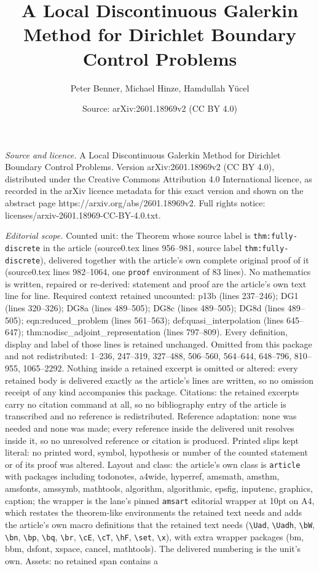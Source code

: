 \documentclass[10pt,a4paper]{amsart}
\title[A Local Discontinuous Galerkin Method for Dirichlet Boundary]{A Local Discontinuous Galerkin Method for Dirichlet Boundary Control Problems}
\author{Peter Benner, Michael Hinze, Hamdullah Y\"ucel}
\date{Source: arXiv:2601.18969v2 (CC BY 4.0)}
\begin{document}
\maketitle

\noindent\emph{Source and licence.} A Local Discontinuous Galerkin Method for Dirichlet Boundary Control Problems. Version arXiv:2601.18969v2 (CC BY 4.0), distributed under the Creative Commons Attribution 4.0 International licence, as recorded in the arXiv licence metadata for this exact version and shown on the abstract page https://arxiv.org/abs/2601.18969v2. Full rights notice: licenses/arxiv-2601.18969-CC-BY-4.0.txt.\par\smallskip

\noindent\textit{Editorial scope.} Counted unit: the Theorem whose source label is \texttt{thm:fully-discrete} in the article (source0.tex lines 956--981, source label \texttt{thm:fully-discrete}), delivered together with the article's own complete original proof of it (source0.tex lines 982--1064, one \texttt{proof} environment of 83 lines). No mathematics is written, repaired or re-derived: statement and proof are the article's own text line for line. Required context retained uncounted: p13b (lines 237--246); DG1 (lines 320--326); DG8a (lines 489--505); DG8c (lines 489--505); DG8d (lines 489--505); eqn:reduced\_problem (lines 561--563); def:quasi\_interpolation (lines 645--647); thm:nodisc\_adjoint\_representation (lines 797--809). Every definition, display and label of those lines is retained unchanged. Omitted from this package and not redistributed: 1--236, 247--319, 327--488, 506--560, 564--644, 648--796, 810--955, 1065--2292. Nothing inside a retained excerpt is omitted or altered: every retained body is delivered exactly as the article's lines are written, so no omission receipt of any kind accompanies this package. Citations: the retained excerpts carry no citation command at all, so no bibliography entry of the article is transcribed and no reference is redistributed. Reference adaptation: none was needed and none was made; every reference inside the delivered unit resolves inside it, so no unresolved reference or citation is produced. Printed slips kept literal: no printed word, symbol, hypothesis or number of the counted statement or of its proof was altered. Layout and class: the article's own class is \texttt{article} with packages including todonotes, a4wide, hyperref, amsmath, amsthm, amsfonts, amssymb, mathtools, algorithm, algorithmic, epsfig, inputenc, graphics, caption; the wrapper is the lane's pinned \texttt{amsart} editorial wrapper at 10pt on A4, which restates the theorem-like environments the retained text needs and adds the article's own macro definitions that the retained text needs (\texttt{\textbackslash Uad}, \texttt{\textbackslash Uadh}, \texttt{\textbackslash bW}, \texttt{\textbackslash bn}, \texttt{\textbackslash bp}, \texttt{\textbackslash bq}, \texttt{\textbackslash br}, \texttt{\textbackslash cE}, \texttt{\textbackslash cT}, \texttt{\textbackslash hF}, \texttt{\textbackslash set}, \texttt{\textbackslash x}), with extra wrapper packages (bm, bbm, dsfont, xspace, cancel, mathtools). The delivered numbering is the unit's own. Assets: no retained span contains a 
\end{document}
